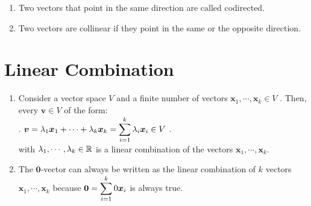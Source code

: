\begin{enumerate}
    \item 
    \begin{definition}[Codirection]
        Two vectors that point in the same direction are called codirected. 
        \hfill \cite{mfml/book/mml/Deisenroth-Faisal-Ong}
    \end{definition}
    
    \item 
    \begin{definition}[Collinearity]
        Two vectors are collinear if they point in the same or the opposite direction. 
        \hfill \cite{mfml/book/mml/Deisenroth-Faisal-Ong}
    \end{definition}
\end{enumerate}
















\section{Linear Combination}

\begin{enumerate}
    \item 
    \begin{definition}
        Consider a vector space $V$ and a finite number of vectors $\bm{x}_1, \cdots , \bm{x}_k \in V$ . 
        Then, every $\bm{v} \in V$ of the form:
        \\
        .\hfill
        $
            \bm{v} 
            = \lambda _1 \bm{x}_1 + \cdots + \lambda _k \bm{x}_k
            = \displaystyle\sum_{i=1}^k \lambda _i \bm{x}_i
            \in V
        $
        \hfill.
        \\
        with $\lambda _1, \cdots , \lambda _k \in \mathbb{R}$ is a linear combination of the vectors $\bm{x}_1, \cdots , \bm{x}_k$.
        \hfill \cite{mfml/book/mml/Deisenroth-Faisal-Ong}
    \end{definition}

    \item The $\bm{0}$-vector can always be written as the linear combination of $k$ vectors $\bm{x}_1, \cdots , \bm{x}_k$ because $\bm{0} = \displaystyle\sum ^k _{i=1} 0 \bm{x}_i$ is always true.
    \hfill \cite{mfml/book/mml/Deisenroth-Faisal-Ong}

    
\end{enumerate}







